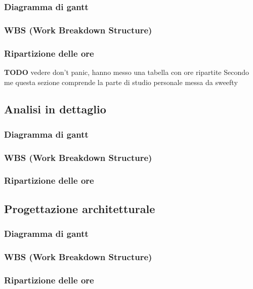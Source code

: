             \subsubsection{Diagramma di gantt}
            \subsubsection{WBS (Work Breakdown Structure)}
            \subsubsection{Ripartizione delle ore}
                \textbf{TODO} vedere don't panic, hanno messo una tabella con ore ripartite
                Secondo me questa sezione comprende la parte di studio personale messa da sweefty
				
        \subsection{Analisi in dettaglio}
            \subsubsection{Diagramma di gantt}
            \subsubsection{WBS (Work Breakdown Structure)}
            \subsubsection{Ripartizione delle ore}

        \subsection{Progettazione architetturale}
            \subsubsection{Diagramma di gantt}
            \subsubsection{WBS (Work Breakdown Structure)}
            \subsubsection{Ripartizione delle ore}

